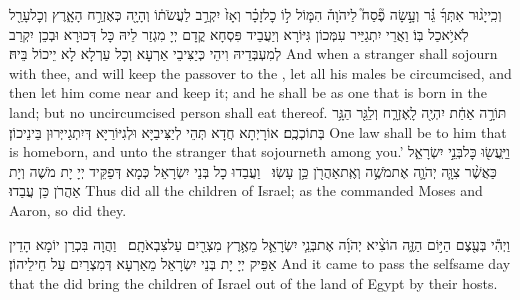 {וְכִֽי\maqqaf יָג֨וּר אִתְּךָ֜ גֵּ֗ר וְעָ֣שָׂה פֶ֘סַח֮ לַיהֹוָה֒ הִמּ֧וֹל ל֣וֹ כׇל\maqqaf זָכָ֗ר וְאָז֙ יִקְרַ֣ב לַעֲשֹׂת֔וֹ וְהָיָ֖ה כְּאֶזְרַ֣ח הָאָ֑רֶץ וְכׇל\maqqaf עָרֵ֖ל לֹֽא\maqqaf יֹ֥אכַל בּֽוֹ׃}
{וַאֲרֵי יִתְגַיַּיר עִמְּכוֹן גִּיּוֹרָא וְיַעֲבֵיד פִּסְחָא קֳדָם יְיָ מִגְזַר לֵיהּ כָּל דְּכוּרָא וּבְכֵן יִקְרַב לְמִעְבְּדֵיהּ וִיהֵי כְּיַצִּיבֵי אַרְעָא וְכָל עַרְלָא לָא יֵיכוֹל בֵּיהּ׃}
{And when a stranger shall sojourn with thee, and will keep the passover to the \lord, let all his males be circumcised, and then let him come near and keep it; and he shall be as one that is born in the land; but no uncircumcised person shall eat thereof.}{}
{תּוֹרָ֣ה אַחַ֔ת יִהְיֶ֖ה לָֽאֶזְרָ֑ח וְלַגֵּ֖ר הַגָּ֥ר בְּתוֹכְכֶֽם׃}
{אוֹרָיְתָא חֲדָא תְּהֵי לְיַצִּיבַיָּא וּלְגִיּוֹרַיָּא דְּיִתְגַייְּרוּן בֵּינֵיכוֹן׃}
{One law shall be to him that is homeborn, and unto the stranger that sojourneth among you.’}{}
{וַיַּֽעֲשׂ֖וּ כׇּל\maqqaf בְּנֵ֣י יִשְׂרָאֵ֑ל כַּאֲשֶׁ֨ר צִוָּ֧ה יְהֹוָ֛ה אֶת\maqqaf מֹשֶׁ֥ה וְאֶֽת\maqqaf אַהֲרֹ֖ן כֵּ֥ן עָשֽׂוּ׃ \setuma }
{וַעֲבַדוּ כָל בְּנֵי יִשְׂרָאֵל כְּמָא דְּפַקֵּיד יְיָ יָת מֹשֶׁה וְיָת אַהֲרֹן כֵּן עֲבַדוּ׃}
{Thus did all the children of Israel; as the \lord\space commanded Moses and Aaron, so did they.}{}

{וַיְהִ֕י בְּעֶ֖צֶם הַיּ֣וֹם הַזֶּ֑ה הוֹצִ֨יא יְהֹוָ֜ה אֶת\maqqaf בְּנֵ֧י יִשְׂרָאֵ֛ל מֵאֶ֥רֶץ מִצְרַ֖יִם עַל\maqqaf צִבְאֹתָֽם׃ \petucha }
{וַהֲוָה בִּכְרַן יוֹמָא הָדֵין אַפֵּיק יְיָ יָת בְּנֵי יִשְׂרָאֵל מֵאַרְעָא דְּמִצְרַיִם עַל חֵילֵיהוֹן׃}
{And it came to pass the selfsame day that the \lord\space did bring the children of Israel out of the land of Egypt by their hosts.}{}

